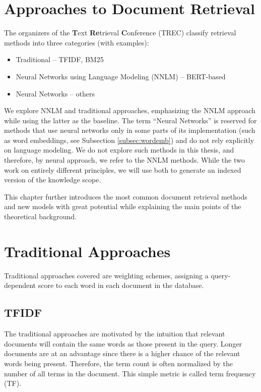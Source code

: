 \section{Approaches to Document Retrieval}

The organizers of the \textbf{T}ext \textbf{Re}trieval \textbf{C}onference (TREC) \citep{trec-2020} classify retrieval methods into three categories (with examples):
\begin{itemize}
        \item Traditional -- TFIDF, BM25
        \item Neural Networks using Language Modeling (NNLM) -- BERT-based
        \item Neural Networks -- others
\end{itemize}
We explore NNLM and traditional approaches, emphasizing the NNLM approach while using the latter as the baseline.
The term ``Neural Networks'' is reserved for methods that use neural networks only in some parts of its implementation (such as word embeddings, see Subsection \ref{subsec:wordemb}) and do not rely explicitly on language modeling.
We do not explore such methods in this thesis, and therefore, by neural approach, we refer to the NNLM methods.
While the two work on entirely different principles, we will use both to generate an indexed version of the knowledge scope.

This chapter further introduces the most common document retrieval methods and new models with great potential while explaining the main points of the theoretical background.

\section{Traditional Approaches}

Traditional approaches covered are weighting schemes, assigning a query-dependent score to each word in each document in the database.

\subsection{TFIDF}

The traditional approaches are motivated by the intuition that relevant documents will contain the same words as those present in the query. 
Longer documents are at an advantage since there is a higher chance of the relevant words being present.
Therefore, the term count is often normalized by the number of all terms in the document.
This simple metric is called term frequency (TF). 

